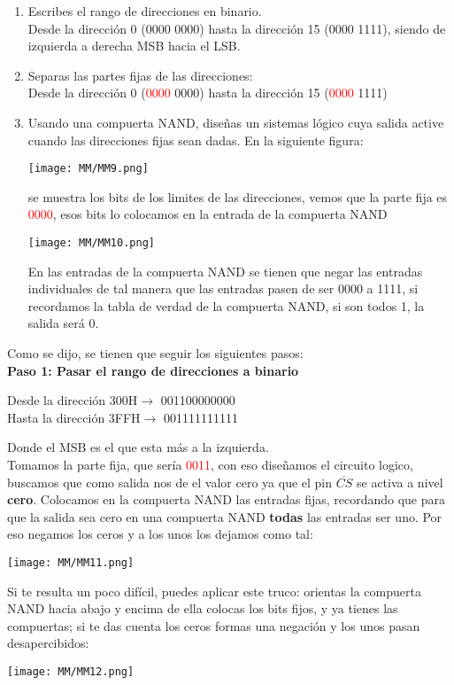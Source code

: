\documentclass[
	12pt, %
	fleqn, %
	a4paper, %
]{LegrandOrangeBook}
\begin{document}
\begin{enumerate}
\item Escribes el rango de direcciones en binario.\\
Desde la dirección 0 (0000 0000) hasta la dirección 15 (0000 1111), siendo de izquierda a derecha MSB hacia el LSB.
\item Separas las partes fijas de las direcciones:\\
Desde la dirección 0 (\textcolor{red}{0000} 0000) hasta la dirección 15 (\textcolor{red}{0000} 1111)
\item Usando una compuerta NAND, diseñas un sistemas lógico cuya salida active cuando las direcciones fijas sean dadas.
En la siguiente figura:
\begin{center}
\texttt{[image: MM/MM9.png]}
\end{center}
se muestra los bits de los limites de las direcciones, vemos que la parte fija es \textcolor{red}{0000}, esos bits lo colocamos en la entrada de la compuerta NAND
\begin{center}
\texttt{[image: MM/MM10.png]}
\end{center}
En las entradas de la compuerta NAND se tienen que negar las entradas individuales de tal manera que las entradas pasen de ser 0000 a 1111, si recordamos la tabla de verdad de la compuerta NAND, si son todos 1, la salida será 0.
\end{enumerate}
\begin{example}
Como se dijo, se tienen que seguir los siguientes pasos:\\
\textbf{Paso 1: Pasar el rango de direcciones a binario}\\
\begin{center}
Desde la dirección 300H$\rightarrow$ 001100000000\\
Hasta la dirección 3FFH$\rightarrow$ 001111111111\\
\end{center}
Donde el MSB es el que esta más a la izquierda.\\
Tomamos la parte fija, que sería \textcolor{red}{0011}, con eso diseñamos el circuito logico, buscamos que como salida nos de el valor cero ya que el pin $\overline{CS}$ se activa a nivel \textbf{cero}. Colocamos en la compuerta NAND las entradas fijas, recordando que para que la salida sea cero en una compuerta NAND \textbf{todas} las entradas ser uno. Por eso negamos los ceros y a los unos los dejamos como tal:
\begin{center}
\texttt{[image: MM/MM11.png]}
\end{center}
\begin{remark}
Si te resulta un poco difícil, puedes aplicar este truco: orientas la compuerta NAND hacia abajo y encima de ella colocas los bits fijos, y ya tienes las compuertas; si te das cuenta los ceros formas una negación y los unos pasan desapercibidos:
\begin{center}
\texttt{[image: MM/MM12.png]}
\end{center}
\end{remark}
\end{example}
\end{document}
